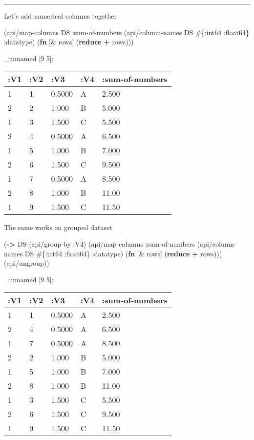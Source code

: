 \documentclass[]{article}
\newenvironment{Shaded}{\begin{snugshade}}{\end{snugshade}}
\newcommand{\KeywordTok}[1]{\textcolor[rgb]{0.13,0.29,0.53}{\textbf{#1}}}
\newcommand{\AttributeTok}[1]{\textcolor[rgb]{0.77,0.63,0.00}{#1}}
\newcommand{\NormalTok}[1]{#1}
\begin{document}
\begin{center}\rule{0.5\linewidth}{0.5pt}\end{center}

Let's add numerical columns together

\begin{Shaded}
\begin{Highlighting}[]
\NormalTok{(api/map-columns DS}
                 \AttributeTok{:sum-of-numbers}
\NormalTok{                 (api/column-names DS  #\{}\AttributeTok{:int64} \AttributeTok{:float64}\NormalTok{\} }\AttributeTok{:datatype}\NormalTok{)}
\NormalTok{                 (}\KeywordTok{fn}\NormalTok{ [& rows]}
\NormalTok{                   (}\KeywordTok{reduce} \KeywordTok{+}\NormalTok{ rows)))}
\end{Highlighting}
\end{Shaded}

\_unnamed {[}9 5{]}:

\begin{longtable}[]{@{}lllll@{}}
\toprule
:V1 & :V2 & :V3 & :V4 & :sum-of-numbers\tabularnewline
\midrule
\endhead
1 & 1 & 0.5000 & A & 2.500\tabularnewline
2 & 2 & 1.000 & B & 5.000\tabularnewline
1 & 3 & 1.500 & C & 5.500\tabularnewline
2 & 4 & 0.5000 & A & 6.500\tabularnewline
1 & 5 & 1.000 & B & 7.000\tabularnewline
2 & 6 & 1.500 & C & 9.500\tabularnewline
1 & 7 & 0.5000 & A & 8.500\tabularnewline
2 & 8 & 1.000 & B & 11.00\tabularnewline
1 & 9 & 1.500 & C & 11.50\tabularnewline
\bottomrule
\end{longtable}

The same works on grouped dataset

\begin{Shaded}
\begin{Highlighting}[]
\NormalTok{(}\KeywordTok{->}\NormalTok{ DS}
\NormalTok{    (api/group-by }\AttributeTok{:V4}\NormalTok{)}
\NormalTok{    (api/map-columns }\AttributeTok{:sum-of-numbers}
\NormalTok{                     (api/column-names DS  #\{}\AttributeTok{:int64} \AttributeTok{:float64}\NormalTok{\} }\AttributeTok{:datatype}\NormalTok{)}
\NormalTok{                     (}\KeywordTok{fn}\NormalTok{ [& rows]}
\NormalTok{                       (}\KeywordTok{reduce} \KeywordTok{+}\NormalTok{ rows)))}
\NormalTok{    (api/ungroup))}
\end{Highlighting}
\end{Shaded}

\_unnamed {[}9 5{]}:

\begin{longtable}[]{@{}lllll@{}}
\toprule
:V1 & :V2 & :V3 & :V4 & :sum-of-numbers\tabularnewline
\midrule
\endhead
1 & 1 & 0.5000 & A & 2.500\tabularnewline
2 & 4 & 0.5000 & A & 6.500\tabularnewline
1 & 7 & 0.5000 & A & 8.500\tabularnewline
2 & 2 & 1.000 & B & 5.000\tabularnewline
1 & 5 & 1.000 & B & 7.000\tabularnewline
2 & 8 & 1.000 & B & 11.00\tabularnewline
1 & 3 & 1.500 & C & 5.500\tabularnewline
2 & 6 & 1.500 & C & 9.500\tabularnewline
1 & 9 & 1.500 & C & 11.50\tabularnewline
\bottomrule
\end{longtable}
\end{document}
